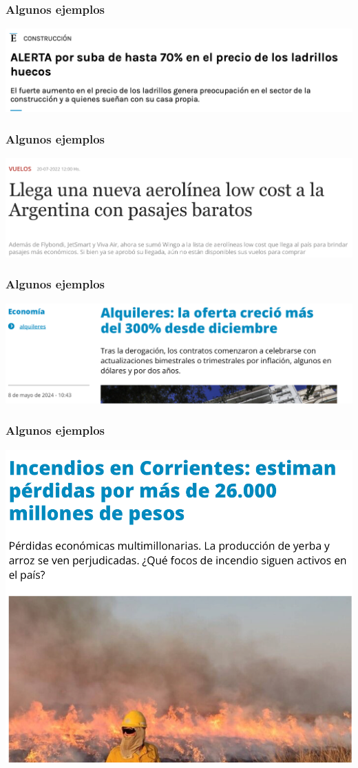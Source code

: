 \documentclass{beamer}
\begin{document}
\begin{frame}
\frametitle{Algunos ejemplos}
    \begin{center}
    \includegraphics[scale=0.35]{../Figures/M6.1.png}
    \end{center}
\end{frame}

\begin{frame}
\frametitle{Algunos ejemplos}
    \begin{center}
    \includegraphics[scale=0.35]{../Figures/M6.2.png}
    \end{center}
\end{frame}

\begin{frame}
\frametitle{Algunos ejemplos}
    \begin{center}
    \includegraphics[scale=0.5]{../Figures/M6.3.png}
    \end{center}
\end{frame}

\begin{frame}
\frametitle{Algunos ejemplos}
    \begin{center}
    \includegraphics[scale=0.45]{../Figures/M6.4.png}
    \end{center}
\end{frame}
\end{document}
